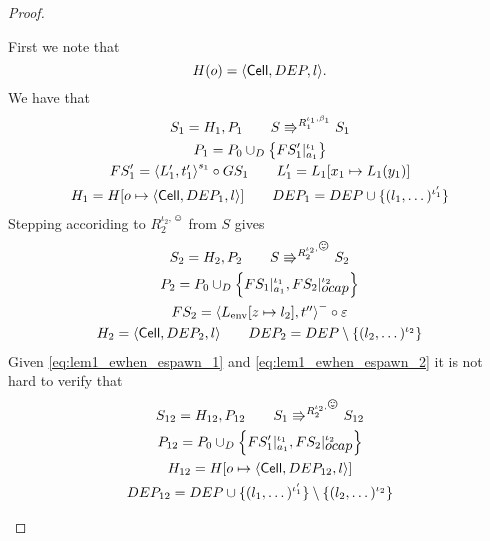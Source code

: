 \begin{proof}
\begin{description}
      First we note that
      \begin{equation}
        H(o) = \mbox{$\langle \mbox{$\mathsf{Cell}$}{}, DEP, l \rangle$}.
      \end{equation}
      We have that 
      \begin{equation} \label{eq:lem1_ewhen_espawn_1}
        \begin{gathered}    
          S_1 = H_1, P_1 \quad\quad S \Rrightarrow^{R_1^{\iota_1, \beta_1}} S_1
          \\
          P_1 = P_0 \cup_D \left\{ FS'_1|_{a_1}^{\iota_1} \right\} \\
          FS'_1 = \mbox{$\langle L'_1, t'_1 \rangle$}^{s_1} \circ GS_1  \quad\quad L'_1 = L_1[x_1 \mapsto
          L_1(y_1)] \\
          H_1 = H[o \mapsto \mbox{$\langle \mbox{$\mathsf{Cell}$}{}, DEP_1, l \rangle$}] \quad\quad DEP_1 = DEP \cup \{ (l_1,
          \dots)^{\iota'_1} \}
        \end{gathered}
      \end{equation}
      Stepping accoriding to $R_2^{\iota_2, \smiley}$ from $S$ gives
      \begin{equation} \label{eq:lem1_ewhen_espawn_2}
        \begin{gathered}
          S_2 = H_2, P_2 \andalso S \Rrightarrow^{R_2^{\iota_2, \smiley}} S_2
          \\
          P_2 = P_0 \cup_D \left\{ FS_1|_{a_1}^{\iota_1},
          FS_2|_{\ocap}^{\iota_2} \right\} \\
          FS_2 = \xframe{L_{\text{env}}[z \mapsto l_2], t''}^{-} \circ
          \varepsilon \\
          H_2 = \Cell{DEP_2, l} \andalso DEP_2 = DEP \setminus \{ (l_2,
          \dots)^{\iota_2} \}
        \end{gathered}
      \end{equation}
      Given \eqref{eq:lem1_ewhen_espawn_1} and \eqref{eq:lem1_ewhen_espawn_2} it
      is not hard to verify that
      \begin{equation} 
        \begin{gathered}
          S_{12} = H_{12}, P_{12} \andalso S_1 \Rrightarrow^{R_2^{\iota_2,
          \smiley}} S_{12}
          \\
          P_{12} = P_0 \cup_D \left\{ FS'_1|_{a_1}^{\iota_1},
          FS_2|_{\ocap}^{\iota_2} \right\} \\
          H_{12} = H[o \mapsto \Cell{DEP_{12}, l}] \\ 
          DEP_{12} = DEP \cup \{ (l_1, \dots)^{\iota'_1} \} \setminus \{ (l_2,
          \dots)^{\iota_2} \}

\end{gathered}
\end{equation}
\end{description}
\end{proof}

